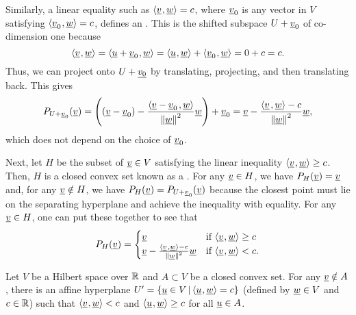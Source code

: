 Similarly, a linear equality such as ${\langle \underline v \mskip1mu , \underline w \rangle}=c$, where $\underline v_{0}$ is any vector in $V$ satisfying ${\langle \underline v_{0} \mskip1mu , \underline w \rangle}=c$,  defines an .
This is the shifted subspace $U+\underline v_{0}$ of co-dimension one because 
\[
{\langle \underline v \mskip1mu , \underline w \rangle}={\langle \underline u+\underline v_{0} \mskip1mu , \underline w \rangle}={\langle \underline u \mskip1mu , \underline w \rangle}+{\langle \underline v_{0} \mskip1mu , \underline w \rangle}=0+c=c.
\]
Thus, we can project onto $U+\underline{v_{0}}$ by translating, projecting, and then translating back. This gives
\begin{equation*}
P_{U+\underline v_{0}}(\underline v)=\left((\underline v-\underline v_{0})-\frac{{\left\langle  \underline v-\underline v_{0} \mskip2mu , \underline w \right\rangle} }{\left\Vert \underline w\right\Vert ^{2}}\underline w\right)+\underline v_{0}=\underline v-\frac{{\left\langle  \underline v \mskip2mu , \underline w \right\rangle} -c}{\left\Vert \underline w\right\Vert ^{2}}\underline w,\label{eq:proj_lin_eq}
\end{equation*}
which does not depend on the choice of $\underline v_{0}$.

Next, let $H$ be the subset of $\underline v\in V$ satisfying the linear inequality ${\langle \underline v \mskip1mu , \underline w \rangle}\geq c$. Then, $H$ is a closed convex set known as a . For any $\underline v\in H$, we have $P_{H}(\underline v)=\underline v$ and, for any $\underline v\notin H$, we have $P_{H}(\underline v)=P_{U+\underline v_{0}}(\underline v)$ because the closest point must lie on the separating hyperplane and achieve the inequality with equality. For any $\underline v\in H$, one can put these together to see that
\begin{equation}
P_{H}(\underline v)=\begin{cases}
\underline v & \text{if }{\langle \underline v \mskip1mu , \underline w \rangle}\geq c\\
\underline v-\frac{{\left\langle  \underline v \mskip2mu , \underline w \right\rangle} -c}{\left\Vert \underline w\right\Vert ^{2}}\underline w & \text{if }{\langle \underline v \mskip1mu , \underline w \rangle}<c.
\end{cases}\label{eq:proj_ineq}
\end{equation}

\begin{theorem} \label{theorem:convex_point_set_hyperplane}
Let $V$ be a Hilbert space over $\mathbb{R}$ and $A\subset V$ be a closed convex set.
For any $\underline{v} \notin A$, there is an affine hyperplane $U' = \{ \underline{u} \in V \,|\, {\langle  \underline{u}  \mskip1mu ,  \underline{w}  \rangle} = c \}$ (defined by $\underline{w} \in V$ and $c\in \mathbb{R}$) such that ${\langle  \underline{v}  \mskip1mu ,  \underline{w}  \rangle} < c$ and ${\langle  \underline{u}  \mskip1mu ,  \underline{w}  \rangle} \geq c$ for all $\underline{u} \in A$.
\end{theorem}

